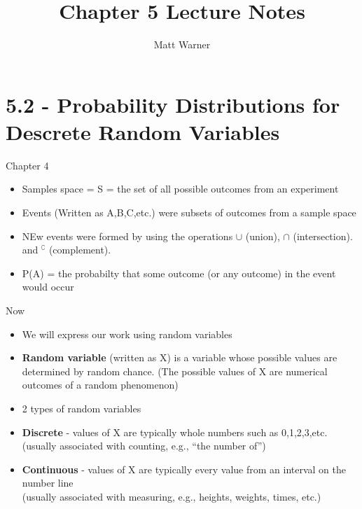 \documentclass{report}
\title{\Huge{Chapter 5 Lecture Notes }}
\author{\huge{Matt Warner}}
\date{\huge{}}
\begin{document}
  \maketitle
  \section*{5.2 - Probability Distributions for Descrete Random Variables}
  \bigbreak \noindent \bigbreak \noindent
  \begin{minipage}{0.5\textwidth}
    \large{\centerline{Chapter 4}}
    \bigbreak \noindent
  \begin{itemize}
    \item Samples space = S = the set of all possible outcomes from an experiment 
    \item Events (Written as A,B,C,etc.) were subsets of outcomes from a sample space
    \item NEw events were formed by using the operations $\cup$ (union), $\cap$ (intersection).  \\ and $^{\complement}$ (complement).  
    \item P(A) = the probabilty that some outcome (or any outcome) in the event would occur
  \end{itemize}	
  \end{minipage}
  \begin{minipage}{0.5\textwidth}
    \large{\centerline{Now}}
    \bigbreak \noindent
    \begin{itemize}
      \item We will express our work using random variables 
      \item \textbf{Random variable} (written as X) is a variable whose possible values are determined by random chance. (The possible values of X are numerical outcomes of a random phenomenon)
      \item 2 types of random variables
    \end{itemize}
        \begin{itemize}[label=$\circ$]
          \item \textbf{Discrete} - values of X are typically whole numbers such as 0,1,2,3,etc. \\ (usually associated with counting, e.g., ``the number of'')
          \item \textbf{Continuous} - values of X are typically every value from an interval on the number line \\ (usually associated with measuring, e.g., heights, weights, times, etc.)
        \end{itemize}
  \end{minipage}
\end{document}
